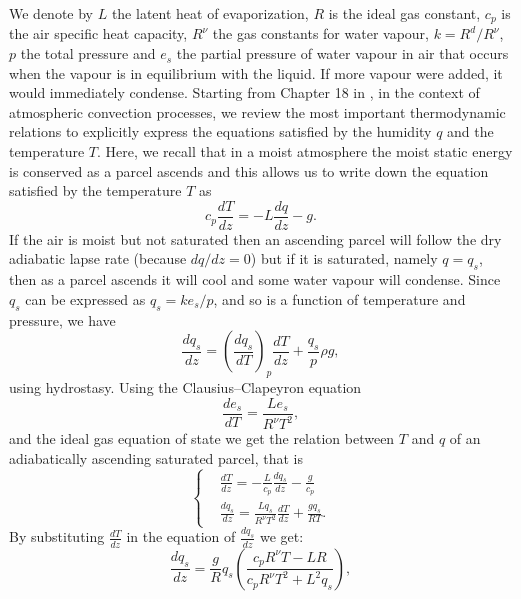 \documentclass[11pt, a4paper, article,reqno,]{amsart}
\theoremstyle{remark}
\numberwithin{equation}{section}
\begin{document}
We denote by $L$ the latent heat of evaporization, $R$ is the ideal gas constant, $c_p$ is the air specific heat capacity, $R^{\nu}$ the gas constants for water vapour, $k=R^d/R^\nu$, $p$ the total pressure and $e_s$ the partial pressure of water vapour in air that occurs when the vapour is in equilibrium with the liquid. If more vapour were added, it would immediately condense. Starting from Chapter 18 in \cite{Vallis}, in the context of atmospheric convection processes, we review the most important thermodynamic relations to explicitly express the equations satisfied by the humidity $q$ and the temperature $T$. Here, we recall that in a moist atmosphere the moist static energy is conserved as a parcel ascends and this allows us to write down the equation satisfied by the temperature $T$ as
\begin{equation*}
    c_p \frac{dT}{dz}= -L \frac{dq}{dz} - g.
\end{equation*}
If the air is moist but not saturated then an ascending parcel will follow the dry adiabatic lapse rate (because $dq/dz= 0$) but if it is saturated, namely $q = q_s$, then as a parcel ascends it will cool and some water vapour will condense. Since $q_s$ can be expressed as $q_s= k e_s/p$, and so is a function of temperature and pressure, we have
\begin{equation*}
    \frac{dq_s}{dz}= \left( \frac{dq_s}{dT}\right)_p\frac{dT}{dz} + \frac{q_s}{p} \rho g,
\end{equation*}
using hydrostasy. Using the Clausius–Clapeyron equation 
\begin{equation*}
    \frac{de_s}{dT} = \frac{Le_s}{R^{\nu} T^2},
\end{equation*}
and the ideal gas equation of state we get the relation between $T$ and $q$ of an adiabatically ascending saturated parcel, that is
\begin{equation*}
    \left\{\begin{aligned}
& \frac{dT}{dz} = - \frac{L}{c_p} \frac{dq_s}{dz}- \frac{g}{c_p}\\
&  \frac{dq_s}{dz} = \frac{L q_s}{R^{\nu} T^2} \frac{dT}{dz} + \frac{g q_s}{R T}.
    \end{aligned}\right.
\end{equation*}
By substituting $\displaystyle{\frac{dT}{dz}}$ in the equation of $\displaystyle{\frac{dq_s}{dz}}$ we get:
\begin{equation*}
    \frac{dq_s}{dz} = \frac{g}{R} q_s \left( \frac{c_p R^{\nu} T- LR}{c_p R^{\nu} T^2 + L^2 q_s} \right),
\end{equation*}
\end{document}

